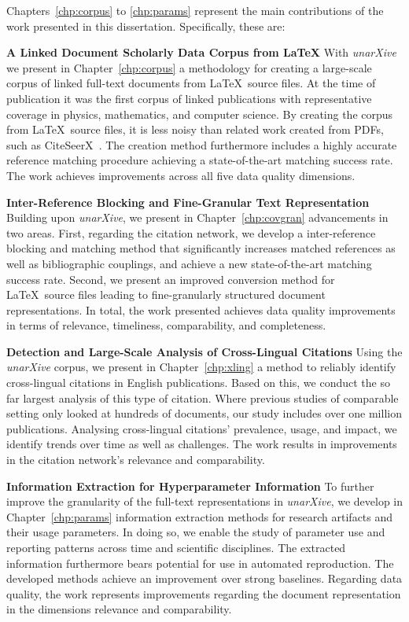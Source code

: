 Chapters~\ref{chp:corpus} to \ref{chp:params} represent the main contributions of the work presented in this dissertation. Specifically, these are:

\textbf{A Linked Document Scholarly Data Corpus from \LaTeX} With \emph{unarXive} we present in Chapter~\ref{chp:corpus} a methodology for creating a large-scale corpus of linked full-text documents from \LaTeX\ source files. At the time of publication it was the first corpus of linked publications with representative coverage in physics, mathematics, and computer science. By creating the corpus from \LaTeX\ source files, it is less noisy than related work created from PDFs, such as CiteSeerX~\cite{Wu2015}. The creation method furthermore includes a highly accurate reference matching procedure achieving a state-of-the-art matching success rate. The work achieves improvements across all five data quality dimensions.

\textbf{Inter-Reference Blocking and Fine-Granular Text Representation} Building upon \emph{unarXive}, we present in Chapter~\ref{chp:covgran} advancements in two areas. First, regarding the citation network, we develop a inter-reference blocking and matching method that significantly increases matched references as well as bibliographic couplings, and achieve a new state-of-the-art matching success rate. Second, we present an improved conversion method for \LaTeX\ source files leading to fine-granularly structured document representations. %
In total, the work presented achieves data quality improvements in terms of relevance, timeliness, comparability, and completeness.

\textbf{Detection and Large-Scale Analysis of Cross-Lingual Citations} Using the \emph{unarXive} corpus, we present in Chapter~\ref{chp:xling} a method to reliably identify cross-lingual citations in English publications. Based on this, we conduct the so far largest analysis of this type of citation. Where previous studies of comparable setting only looked at hundreds of documents, our study includes over one million publications. Analysing cross-lingual citations' prevalence, usage, and impact, we identify trends over time as well as challenges. The work results in improvements in the citation network's relevance and comparability.

\textbf{Information Extraction for Hyperparameter Information} To further improve the granularity of the full-text representations in \emph{unarXive}, we develop in Chapter~\ref{chp:params} information extraction methods for research artifacts and their usage parameters. In doing so, we enable the study of parameter use and reporting patterns across time and scientific disciplines. The extracted information furthermore bears potential for use in automated reproduction. The developed methods achieve an improvement over strong baselines. Regarding data quality, the work represents improvements regarding the document representation in the dimensions relevance and comparability.

